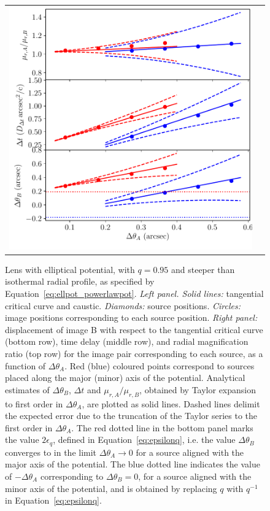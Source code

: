 \documentclass[usenatbib]{mnras}
\def\Eref#1{Equation~\ref{#1}\xspace}
\begin{document}
\begin{figure}
\begin{tabular}{cc}
 \includegraphics[width=\columnwidth]{ellpot_plots-eps-converted-to.pdf}
 \end{tabular}
 \caption{Lens with elliptical potential, with $q=0.95$ and steeper than isothermal radial profile, as specified by \Eref{eq:ellpot_powerlawpot}. {\em Left panel. Solid lines:} tangential critical curve and caustic. {\em Diamonds:} source positions. {\em Circles:} image positions corresponding to each source position.
{\em Right panel:} displacement of image B with respect to the tangential critical curve (bottom row), time delay (middle row), and radial magnification ratio (top row) for the image pair corresponding to each source, as a function of $\Delta\theta_A$.
Red (blue) coloured points correspond to sources placed along the major (minor) axis of the potential. 
Analytical estimates of $\Delta\theta_B$, $\Delta t$ and $\mu_{r,A}/\mu_{r,B}$, obtained by Taylor expansion to first order in $\Delta\theta_A$, are plotted as solid lines. Dashed lines delimit the expected error due to the truncation of the Taylor series to the first order in $\Delta\theta_A$.
The red dotted line in the bottom panel marks the value $2\epsilon_q$, defined in \Eref{eq:epsilonq}, i.e. the value $\Delta\theta_B$ converges to in the limit $\Delta\theta_A\rightarrow0$ for a source aligned with the major axis of the potential. The blue dotted line indicates the value of $-\Delta\theta_A$ corresponding to $\Delta\theta_B=0$, for a source aligned with the minor axis of the potential, and is obtained by replacing $q$ with $q^{-1}$ in \Eref{eq:epsilonq}.
}
 \label{fig:ellpot}
\end{figure}
%
\end{document}
